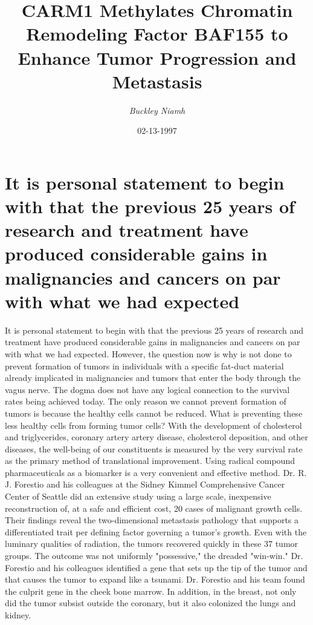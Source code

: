 \documentclass{article}%
\title{CARM1 Methylates Chromatin Remodeling Factor BAF155 to Enhance Tumor Progression and Metastasis}%
\author{\textit{Buckley Niamh}}%
\date{02-13-1997}%
\begin{document}
%
\normalsize%
\maketitle%
\section{It is personal statement to begin with that the previous 25 years of research and treatment have produced considerable gains in malignancies and cancers on par with what we had expected}%
\label{sec:Itispersonalstatementtobeginwiththattheprevious25yearsofresearchandtreatmenthaveproducedconsiderablegainsinmalignanciesandcancersonparwithwhatwehadexpected}%
It is personal statement to begin with that the previous 25 years of research and treatment have produced considerable gains in malignancies and cancers on par with what we had expected. However, the question now is why is not done to prevent formation of tumors in individuals with a specific fat{-}duct material already implicated in malignancies and tumors that enter the body through the vagus nerve.\newline%
The dogma does not have any logical connection to the survival rates being achieved today. The only reason we cannot prevent formation of tumors is because the healthy cells cannot be reduced. What is preventing these less healthy cells from forming tumor cells? With the development of cholesterol and triglycerides, coronary artery artery disease, cholesterol deposition, and other diseases, the well{-}being of our constituents is measured by the very survival rate as the primary method of translational improvement. Using radical compound pharmaceuticals as a biomarker is a very convenient and effective method.\newline%
Dr. R. J. Forestio and his colleagues at the Sidney Kimmel Comprehensive Cancer Center of Seattle did an extensive study using a large scale, inexpensive reconstruction of, at a safe and efficient cost, 20 cases of malignant growth cells. Their findings reveal the two{-}dimensional metastasis pathology that supports a differentiated trait per defining factor governing a tumor's growth.\newline%
Even with the luminary qualities of radiation, the tumors recovered quickly in these 37 tumor groups. The outcome was not uniformly "possessive," the dreaded "win{-}win." Dr. Forestio and his colleagues identified a gene that sets up the tip of the tumor and that causes the tumor to expand like a tsunami. Dr. Forestio and his team found the culprit gene in the cheek bone marrow. In addition, in the breast, not only did the tumor subsist outside the coronary, but it also colonized the lungs and kidney.\newline%
\end{document}
